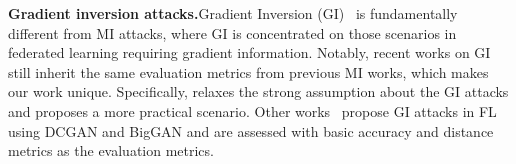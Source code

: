\noindent
\textbf{Gradient inversion attacks.}\quad Gradient Inversion (GI)~\cite{wr1} is fundamentally different from MI attacks, where GI is concentrated on those scenarios in federated learning requiring gradient information. Notably, recent works on GI~\cite{wr2, wr3, wr4, wr6} still inherit the same evaluation metrics from previous MI works, which makes our work unique. Specifically, \cite{wr1} relaxes the strong assumption about the GI attacks and proposes a more practical scenario. Other works~\cite{wr2, wr3, wr4, wr6} propose GI attacks in FL using DCGAN and BigGAN and are assessed with basic accuracy and distance metrics as the evaluation metrics.